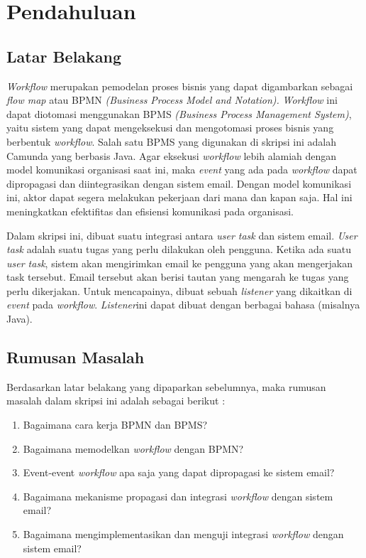 \chapter{Pendahuluan}
\label{chap:intro}
   
\section{Latar Belakang}
\label{sec:label}

\textit{Workflow} merupakan pemodelan proses bisnis yang dapat digambarkan sebagai \textit{flow map} atau BPMN \textit{(Business Process Model and Notation).} \textit{Workflow} ini dapat diotomasi menggunakan BPMS \textit{(Business Process Management System)}, yaitu sistem yang dapat mengeksekusi dan mengotomasi proses bisnis yang berbentuk \textit{workflow}. Salah satu BPMS yang digunakan di skripsi ini adalah Camunda yang berbasis Java. Agar eksekusi \textit{workflow} lebih alamiah dengan model komunikasi organisasi saat ini, maka \textit{event} yang ada pada \textit{workflow} dapat dipropagasi dan diintegrasikan dengan sistem email. Dengan model komunikasi ini, aktor dapat segera melakukan pekerjaan dari mana dan kapan saja. Hal ini meningkatkan efektifitas dan efisiensi komunikasi pada organisasi. 

Dalam skripsi ini, dibuat suatu integrasi antara \textit{user task} dan sistem email. \textit{User task} adalah suatu tugas yang perlu dilakukan oleh pengguna. Ketika ada suatu \textit{user task}, sistem akan mengirimkan email ke pengguna yang akan mengerjakan task tersebut. Email tersebut akan berisi tautan yang mengarah ke tugas yang perlu dikerjakan. Untuk mencapainya, dibuat sebuah \textit{listener} yang dikaitkan di \textit{event} pada \textit{workflow}. \textit{Listener}ini dapat dibuat dengan berbagai bahasa (misalnya Java). 



\section{Rumusan Masalah}
\label{sec:rumusan}

Berdasarkan latar belakang yang dipaparkan sebelumnya, maka rumusan masalah dalam skripsi ini adalah sebagai berikut :
\begin{enumerate}
	\item Bagaimana cara kerja BPMN dan BPMS?
	\item Bagaimana memodelkan \textit{workflow} dengan BPMN?
	\item Event-event \textit{workflow} apa saja yang dapat dipropagasi ke sistem email?
	\item Bagaimana mekanisme propagasi dan integrasi \textit{workflow} dengan sistem email?
	\item Bagaimana mengimplementasikan dan menguji integrasi \textit{workflow} dengan sistem email?
\end{enumerate} 




